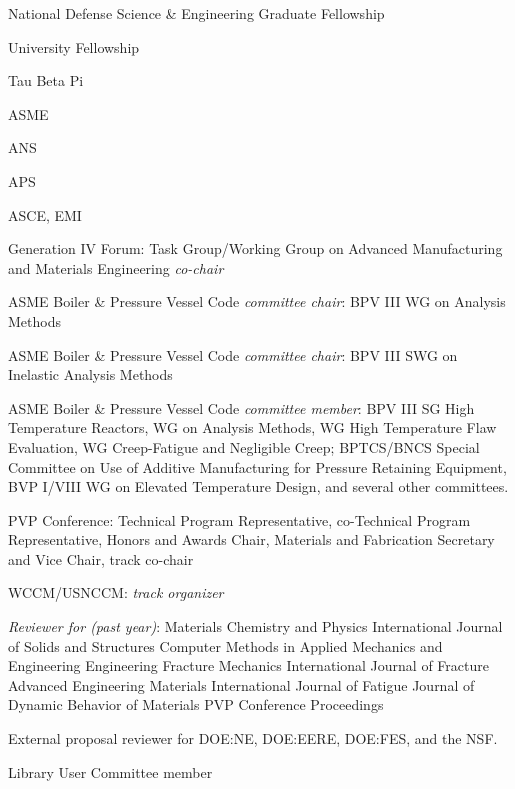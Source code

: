 National Defense Science \& Engineering Graduate Fellowship 

University Fellowship 

Tau Beta Pi 


ASME 

ANS 

APS 

ASCE, EMI 


Generation IV Forum:  Task Group/Working Group on Advanced Manufacturing and Materials Engineering \emph{co-chair} 

ASME Boiler \& Pressure Vessel Code \emph{committee chair}:  BPV III WG on Analysis Methods

ASME Boiler \& Pressure Vessel Code \emph{committee chair}:  BPV III SWG on Inelastic Analysis Methods 

ASME Boiler \& Pressure Vessel Code \emph{committee member}:  BPV III SG High Temperature Reactors,
WG on Analysis Methods, WG High Temperature Flaw Evaluation, 
WG Creep-Fatigue and Negligible Creep; BPTCS/BNCS Special Committee on 
Use of Additive Manufacturing for Pressure Retaining Equipment, BVP I/VIII WG on Elevated Temperature Design, and several other committees.

PVP Conference:  Technical Program Representative, co-Technical Program Representative, Honors and Awards Chair, Materials and Fabrication Secretary and Vice Chair, track co-chair

WCCM/USNCCM:  \emph{track organizer} 

\emph{Reviewer for (past year)}:   
Materials Chemistry and Physics
International Journal of Solids and Structures
Computer Methods in Applied Mechanics and Engineering
Engineering Fracture Mechanics
International Journal of Fracture
Advanced Engineering Materials
International Journal of Fatigue
Journal of Dynamic Behavior of Materials
PVP Conference Proceedings

External proposal reviewer for DOE:NE, DOE:EERE, DOE:FES, and the NSF. 


Library User Committee member 

